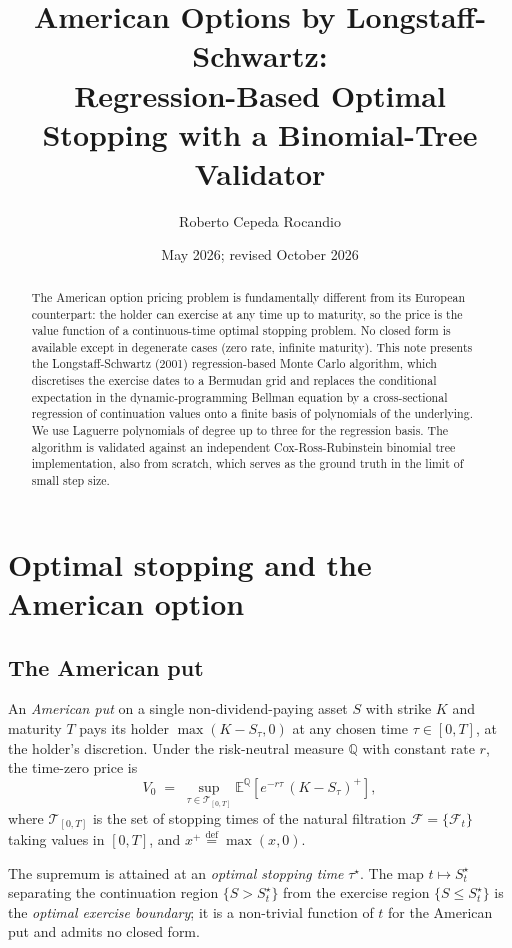 \documentclass[11pt,a4paper]{article}
\title{American Options by Longstaff-Schwartz:\\
       Regression-Based Optimal Stopping with a Binomial-Tree Validator}
\author{Roberto Cepeda Rocandio}
\date{May 2026; revised October 2026}
\theoremstyle{plain}
\theoremstyle{definition}
\theoremstyle{remark}
\newcommand{\E}{\mathbb{E}}
\newcommand{\F}{\mathcal{F}}
\newcommand{\Q}{\mathbb{Q}}
\newcommand{\Tcal}{\mathcal{T}}
\newcommand{\eqdef}{\overset{\mathrm{def}}{=}}
\begin{document}
\maketitle

\begin{abstract}
The American option pricing problem is fundamentally different from
its European counterpart: the holder can exercise at any time up to
maturity, so the price is the value function of a continuous-time
optimal stopping problem. No closed form is available except in
degenerate cases (zero rate, infinite maturity). This note presents
the Longstaff-Schwartz (2001) regression-based Monte Carlo algorithm,
which discretises the exercise dates to a Bermudan grid and replaces
the conditional expectation in the dynamic-programming Bellman
equation by a cross-sectional regression of continuation values onto
a finite basis of polynomials of the underlying. We use Laguerre
polynomials of degree up to three for the regression basis. The
algorithm is validated against an independent Cox-Ross-Rubinstein
binomial tree implementation, also from scratch, which serves as the
ground truth in the limit of small step size.
\end{abstract}

\tableofcontents

\section{Optimal stopping and the American option}
\label{sec:setting}

\subsection{The American put}

An \emph{American put} on a single non-dividend-paying asset $S$ with
strike $K$ and maturity $T$ pays its holder $\max(K - S_\tau, 0)$ at
any chosen time $\tau \in [0, T]$, at the holder's discretion. Under
the risk-neutral measure $\Q$ with constant rate $r$, the time-zero
price is
\begin{equation}
V_0 \;=\; \sup_{\tau \in \Tcal_{[0, T]}}
            \E^{\Q}\!\left[ e^{-r\tau}\, (K - S_\tau)^+ \right],
\label{eq:american-price}
\end{equation}
where $\Tcal_{[0, T]}$ is the set of stopping times of the natural
filtration $\F = \{\F_t\}$ taking values in $[0, T]$, and
$x^+ \eqdef \max(x, 0)$.

The supremum is attained at an \emph{optimal stopping time} $\tau^\star$.
The map $t \mapsto S_t^\star$ separating the continuation region
$\{S > S_t^\star\}$ from the exercise region $\{S \le S_t^\star\}$ is
the \emph{optimal exercise boundary}; it is a non-trivial function of
$t$ for the American put and admits no closed form.
\end{document}
